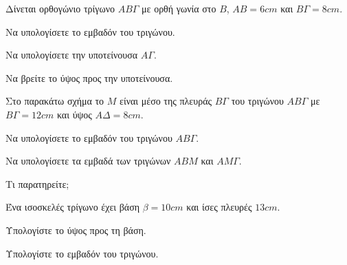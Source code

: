 \documentclass[11pt,a4paper,modern]{FFExercises}
\begin{document}
\askhsh Δίνεται ορθογώνιο τρίγωνο $AB\varGamma$ με ορθή γωνία στο $B$, $AB=6\si{cm}$ και $B\varGamma=8\si{cm}$.
\begin{center}
\end{center}
\begin{alist}
\item Να υπολογίσετε το εμβαδόν του τριγώνου.
\item Να υπολογίσετε την υποτείνουσα $A\varGamma$.
\item Να βρείτε το ύψος προς την υποτείνουσα.
\end{alist}

\askhsh Στο παρακάτω σχήμα το $M$ είναι μέσο της πλευράς $B\varGamma$ του τριγώνου $AB\varGamma$ με $B\varGamma=12\si{cm}$ και ύψος $A\varDelta=8\si{cm}$.
\begin{center}
\end{center}
\begin{alist}
\item Να υπολογίσετε το εμβαδόν του τριγώνου $AB\varGamma$.
\item Να υπολογίσετε τα εμβαδά των τριγώνων $ABM$ και $AM\varGamma$.
\item Τι παρατηρείτε;
\end{alist}

\askhsh Ένα ισοσκελές τρίγωνο έχει βάση $\beta=10\si{cm}$ και ίσες πλευρές $13\si{cm}$.
\begin{alist}
\item Υπολογίστε το ύψος προς τη βάση.
\item Υπολογίστε το εμβαδόν του τριγώνου.
\end{alist}
\end{document}
